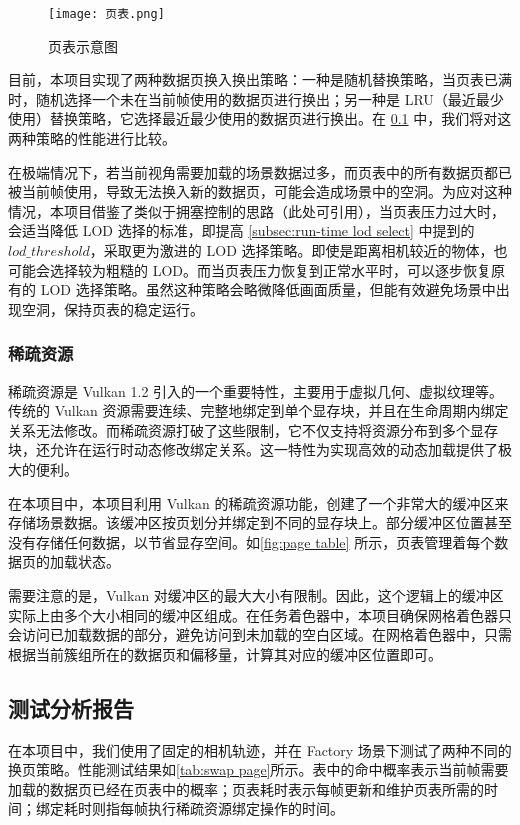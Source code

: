 \begin{figure}[!htb]
    \centering
    \texttt{[image: 页表.png]}
    \caption{\label{fig:page table}页表示意图}
\end{figure}

目前，本项目实现了两种数据页换入换出策略：一种是随机替换策略，当页表已满时，随机选择一个未在当前帧使用的数据页进行换出；另一种是 LRU（最近最少使用）替换策略，它选择最近最少使用的数据页进行换出。在 \ref{subsec:streaming test} 中，我们将对这两种策略的性能进行比较。

在极端情况下，若当前视角需要加载的场景数据过多，而页表中的所有数据页都已被当前帧使用，导致无法换入新的数据页，可能会造成场景中的空洞。为应对这种情况，本项目借鉴了类似于拥塞控制的思路（此处可引用），当页表压力过大时，会适当降低 LOD 选择的标准，即提高 \ref{subsec:run-time lod select} 中提到的 $lod\_threshold$，采取更为激进的 LOD 选择策略。即使是距离相机较近的物体，也可能会选择较为粗糙的 LOD。而当页表压力恢复到正常水平时，可以逐步恢复原有的 LOD 选择策略。虽然这种策略会略微降低画面质量，但能有效避免场景中出现空洞，保持页表的稳定运行。

\subsubsection{稀疏资源}

稀疏资源是 Vulkan 1.2 引入的一个重要特性，主要用于虚拟几何、虚拟纹理等。传统的 Vulkan 资源需要连续、完整地绑定到单个显存块，并且在生命周期内绑定关系无法修改。而稀疏资源打破了这些限制，它不仅支持将资源分布到多个显存块，还允许在运行时动态修改绑定关系。这一特性为实现高效的动态加载提供了极大的便利。

在本项目中，本项目利用 Vulkan 的稀疏资源功能，创建了一个非常大的缓冲区来存储场景数据。该缓冲区按页划分并绑定到不同的显存块上。部分缓冲区位置甚至没有存储任何数据，以节省显存空间。如\autoref{fig:page table} 所示，页表管理着每个数据页的加载状态。

需要注意的是，Vulkan 对缓冲区的最大大小有限制。因此，这个逻辑上的缓冲区实际上由多个大小相同的缓冲区组成。在任务着色器中，本项目确保网格着色器只会访问已加载数据的部分，避免访问到未加载的空白区域。在网格着色器中，只需根据当前簇组所在的数据页和偏移量，计算其对应的缓冲区位置即可。

\subsection{测试分析报告} \label{subsec:streaming test}

在本项目中，我们使用了固定的相机轨迹，并在 Factory 场景下测试了两种不同的换页策略。性能测试结果如\autoref{tab:swap page}所示。表中的命中概率表示当前帧需要加载的数据页已经在页表中的概率；页表耗时表示每帧更新和维护页表所需的时间；绑定耗时则指每帧执行稀疏资源绑定操作的时间。

